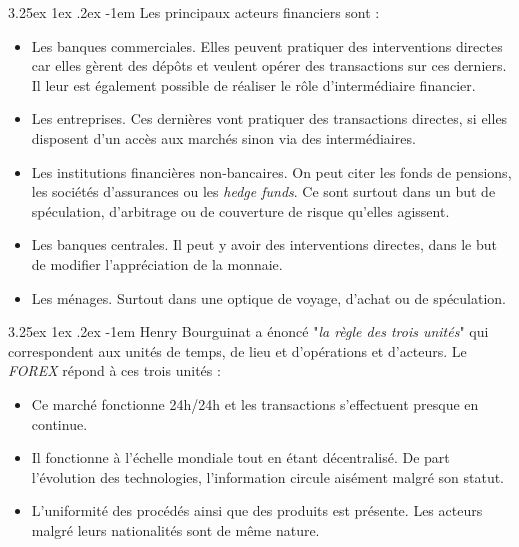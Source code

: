 \documentclass[a4paper, 11pt]{article}
\makeatletter
\renewcommand\paragraph{\@startsection{paragraph}{5}{\z@}%
  {3.25ex \@plus1ex \@minus.2ex}%
  {-1em}%
  {\normalfont\normalsize\bfseries}}
\makeatother
\begin{document}
\paragraph{}
Les principaux acteurs financiers sont \cite{marche_des_changes}:
\begin{itemize}
\item Les banques commerciales. 
Elles peuvent pratiquer des interventions directes car elles gèrent des dépôts et veulent opérer des transactions sur ces derniers.
Il leur est également possible de réaliser le rôle d'intermédiaire financier.

\item Les entreprises. Ces dernières vont pratiquer des transactions directes, si elles disposent d'un accès aux marchés
sinon via des intermédiaires.

\item Les institutions financières non-bancaires. On peut citer les fonds de pensions, les sociétés d'assurances
ou les \textit{hedge funds}. Ce sont surtout dans un but de spéculation, d'arbitrage ou de couverture de risque qu'elles agissent.

\item Les banques centrales. Il peut y avoir des interventions directes, dans le but de modifier l'appréciation de la monnaie.

\item Les ménages. Surtout dans une optique de voyage, d'achat ou de spéculation.
\end{itemize}

\paragraph{}
Henry Bourguinat a énoncé "\textit{la règle des trois unités}" qui correspondent aux unités de temps, de lieu 
et d'opérations et d'acteurs.
Le \textit{FOREX} répond à ces trois unités \cite{site_fr_forex}:
\begin{itemize}
\item Ce marché fonctionne 24h/24h et les transactions s'effectuent presque en continue.

\item Il fonctionne à l'échelle mondiale tout en étant décentralisé. 
De part l'évolution des technologies, l'information circule aisément malgré son statut.

\item L'uniformité des procédés ainsi que des produits est présente. Les acteurs malgré leurs nationalités sont de même nature.
\end{itemize}
\end{document}
